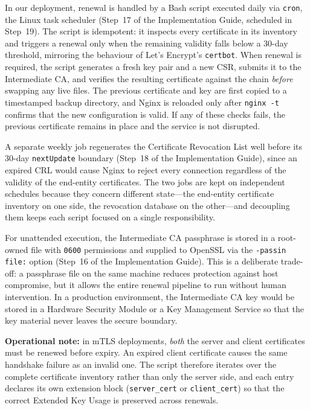 \documentclass[10pt,twocolumn]{article}
\newcommand{\IGbase}{https://github.com/willLeckyThom/NetworkSecurity/blob/main/Projet/certificate_chain.md}
\newif\ifIGhref
\newcommand{\IGdoc}[1]{\ifIGhref\href{\IGbase}{#1}\else#1\fi}%
\newcommand{\IGstep}[2]{\ifIGhref\href{\IGbase\##1}{#2}\else#2\fi}%
\begin{document}
In our deployment, renewal is handled by a Bash script executed daily via
\texttt{cron}, the Linux task scheduler
(\IGstep{step-17-create-the-renewal-script}{Step~17} of the
\IGdoc{Implementation Guide}, scheduled in
\IGstep{step-19-schedule-everything-with-cron}{Step~19}). The script is
idempotent: it inspects every certificate in its inventory and triggers a
renewal only when the remaining validity falls below a 30-day threshold,
mirroring the behaviour of Let's Encrypt's \texttt{certbot}. When renewal is
required, the script generates a fresh key pair and a new CSR, submits it to
the Intermediate CA, and verifies the resulting certificate against the chain
\emph{before} swapping any live files. The previous certificate and key
are first copied to a timestamped backup directory, and Nginx is reloaded
only after \texttt{nginx -t} confirms that the new configuration is valid.
If any of these checks fails, the previous certificate remains in place
and the service is not disrupted.

A separate weekly job regenerates the Certificate Revocation List well
before its 30-day \texttt{nextUpdate} boundary
(\IGstep{step-18-create-the-crl-refresh-script}{Step~18 of the Implementation
Guide}), since an expired CRL would cause Nginx to reject every connection
regardless of the validity of the end-entity certificates. The two jobs are
kept on independent schedules because they concern different state---the
end-entity certificate inventory on one side, the revocation database on the
other---and decoupling them keeps each script focused on a single
responsibility.

For unattended execution, the Intermediate CA passphrase is stored in a
root-owned file with \texttt{0600} permissions and supplied to OpenSSL via
the \texttt{-passin file:} option
(\IGstep{step-16-handle-the-encrypted-intermediate-ca-key}{Step~16 of the
Implementation Guide}). This is a deliberate trade-off: a
passphrase file on the same machine reduces protection against host
compromise, but it allows the entire renewal pipeline to run without human
intervention. In a production environment, the Intermediate CA key would
be stored in a Hardware Security Module or a Key Management Service so
that the key material never leaves the secure boundary.

\begin{alertbox}
\footnotesize\textbf{Operational note:} in mTLS deployments, \emph{both}
the server and client certificates must be renewed before expiry. An
expired client certificate causes the same handshake failure as an invalid
one. The script therefore iterates over the complete certificate inventory
rather than only the server side, and each entry declares its own
extension block (\texttt{server\_cert} or \texttt{client\_cert}) so that
the correct Extended Key Usage is preserved across renewals.
\end{alertbox}
\end{document}

